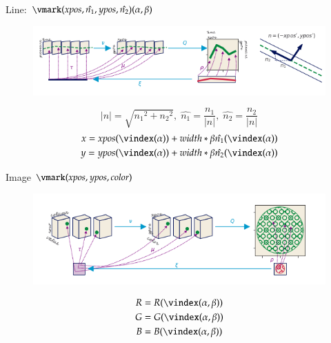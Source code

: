 \documentclass[xcolor={dvipsnames}, handout]{beamer}
\begin{document}
\begin{frame}{Line: $\vmark(xpos, \hat{n_{1}}, ypos, \hat{n_{2}})(\alpha, \beta)$ }
    \begin{figure}[H]
        \includegraphics[width=1\textwidth]{figures/math/line.png}
    \end{figure}
        \begin{equation*}
            \lvert n \rvert = \sqrt{{n_{1}}^2 + {n_{2}}^2},\; 
            \hat{n_{1}} = \frac{n_1}{\lvert n \rvert}, \; \hat{n_{2}} = \frac{n_2}{\lvert n \rvert}
        \end{equation*}
    \begin{align*}
     x = xpos(\vindex(\alpha)) &+ width*\beta\hat{n_1}(\vindex(\alpha)) \\
     y = ypos(\vindex(\alpha)) &+ width*\beta\hat{n_2}(\vindex(\alpha)) 
    \end{align*}
\end{frame}

\begin{frame}{Image $\vmark(xpos, ypos, color)$}
    \begin{figure}[H]
        \includegraphics[width=1\textwidth]{figures/math/image.png}
    \end{figure}
    \begin{align*}
        R &= R(\vindex(\alpha, \beta))\\
        G &= G(\vindex(\alpha, \beta))\\
        B &= B(\vindex(\alpha, \beta))
    \end{align*}
\end{frame}
\end{document}
